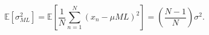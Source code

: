 \begin{equation}
\label{eq:sigma}
\mathbb{E}[\sigma^2_{ML}] = \mathbb{E}\left[\frac{1}{N} \sum_{n = 1}^{N}{(x_n -
\mu{ML})^2} \right] = \left( \frac{N - 1}{N} \right) \sigma^2.
\end{equation}